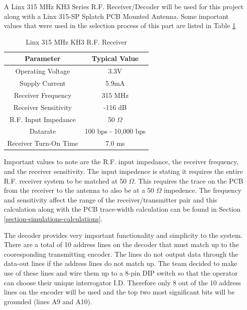 \documentclass[letterpaper,10pt]{article}
\begin{document}
\begin{spacing}{1.15}
A Linx 315 MHz KH3 Series R.F. Receiver/Decoder will be used for this project along with a Linx 315-SP Splatch PCB Mounted Antenna. Some important values that were used in the selection process of this part are listed in Table \ref{tab:rf-receiver-important-values}

\begin{table}[htbp]
	\centering
	\begin{tabular}{c|c}	%
		\toprule	%
		Parameter & Typical Value \\
		\midrule
		Operating Voltage & 3.3V\\
	 	Supply Current & 5.9mA\\
		Receiver Frequency & 315 MHz \\ 
		Receiver Sensitivity & -116 dB \\
		R.F. Input Impedance & 50 $\Omega$ \\
		Datarate & 100 bps - 10,000 bps  \\
		Receiver Turn-On Time & 7.0 ms  \\
		\bottomrule	%
	\end{tabular}%
	\caption{Linx 315 MHz KH3 R.F. Receiver}
	\label{tab:rf-receiver-important-values}	%
\end{table}%

Important values to note are the R.F. input impedance, the receiver frequency, and the receiver sensitivity. The input impedence is stating it requires the entire R.F. receiver system to be matched at 50 $\Omega$. This requires the trace on the PCB from the receiver to the antenna to also be at a 50 $\Omega$ impedence. The frequency and sensitivity affect the range of the receiver/transmitter pair and this calculation along with the PCB trace-width calculation can be found in Section \ref{section-simulations-calculations}.

The decoder provides very important functionality and simplicity to the system. There are a total of 10 address lines on the decoder that must match up to the cooresponding transmitting encoder. The lines do not output data through the data-out lines if the address lines do not match up. The team decided to make use of these lines and wire them up to a 8-pin DIP switch so that the operator can choose their unique interrogator I.D. Therefore only 8 out of the 10 address lines on the encoder will be used and the top two most significant bits will be grounded (lines A9 and A10).


\end{spacing}
\end{document}
